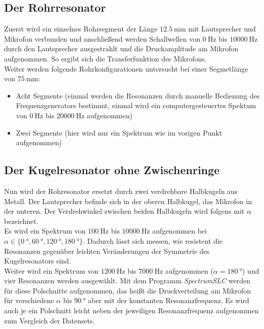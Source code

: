 \documentclass[../main.tex]{subfiles}
\begin{document}
    
\subsection{Der Rohrresonator}
    Zuerst wird ein einzelnes Rohrsegment der Länge $\SI{12.5}{\milli\metre}$ mit Lautsprecher und Mikrofon verbunden und anschließend werden Schallwellen von $\SI{0}{\hertz}$ bis $\SI{10000}{\hertz}$ durch den  Lautsprecher ausgestrahlt und die Druckamplitude am Mikrofon aufgenommen. So ergibt sich die Transferfunktion des Mikrofons.\\

    Weiter werden folgende Rohrkonfigurationen untersucht bei einer Segmetlänge von $\SI{75}{\milli\metre}$:
    \begin{itemize}
        \item Acht Segmente (einmal werden die Resonanzen durch manuelle Bedienung des Frequenzgenerators bestimmt, einmal wird ein computergesteuertes Spektum von $\SI{0}{\hertz}$ bis $\SI{20000}{\hertz}$ aufgenommen)
        \item Zwei Segmente (hier wird nur ein Spektrum wie im vorigen Punkt aufgenommen)
    \end{itemize}

\subsection{Der Kugelresonator ohne Zwischenringe}
    Nun wird der Rohresonator ersetzt durch zwei verdrehbare Halbkugeln aus Metall. Der Lautsprecher befinde sich in der oberen Halbkugel, das Mikrofon in der unteren. Der Verdrehwinkel zwischen beiden Halbkugeln wird folgens mit $\alpha$ bezeichnet.\\

    Es wird ein Spektrum von $\SI{100}{\hertz}$ bis $\SI{10000}{\hertz}$ aufgenommen bei $\alpha\in\{\SI{0}{\degree}, \SI{60}{\degree}, \SI{120}{\degree}, \SI{180}{\degree}\}$. Dadurch lässt sich messen, wie resistent die Resonanzen gegenüber leichten Veränderungen der Symmetrie des Kugelresonators sind.\\

    Weiter wird ein Spektrum von $\SI{1200}{\hertz}$ bis $\SI{7000}{\hertz}$ aufgenommen ($\alpha=\SI{180}{\degree}$) und vier Resonanzen werden ausgewählt. Mit dem Programm \textit{SpectrumSLC} werden für diese Polschnitte aufgenommen, das heißt die Druckverteilung am Mikrofon für verschiedene $\alpha$ bis $\SI{90}{\degree}$ aber mit der konstanten Resonanzfrequenz. Es wird auch je ein Polschnitt leicht neben der jeweiligen Resonanzfrequenz aufgenommen zum Vergleich der Datensets.\\
\end{document}
